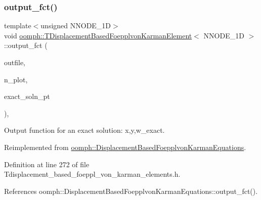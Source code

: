 \subsubsection{\texorpdfstring{output\+\_\+fct()}{output\_fct()}\hspace{0.1cm}{\footnotesize\ttfamily [1/2]}}
{\footnotesize\ttfamily template$<$unsigned N\+N\+O\+D\+E\+\_\+1D$>$ \\
void \hyperlink{classoomph_1_1TDisplacementBasedFoepplvonKarmanElement}{oomph\+::\+T\+Displacement\+Based\+Foepplvon\+Karman\+Element}$<$ N\+N\+O\+D\+E\+\_\+1D $>$\+::output\+\_\+fct (\begin{DoxyParamCaption}\item[{std\+::ostream \&}]{outfile,  }\item[{const unsigned \&}]{n\+\_\+plot,  }\item[{\hyperlink{classoomph_1_1FiniteElement_a690fd33af26cc3e84f39bba6d5a85202}{Finite\+Element\+::\+Steady\+Exact\+Solution\+Fct\+Pt}}]{exact\+\_\+soln\+\_\+pt }\end{DoxyParamCaption})\hspace{0.3cm}{\ttfamily [inline]}, {\ttfamily [virtual]}}



Output function for an exact solution\+: x,y,w\+\_\+exact. 



Reimplemented from \hyperlink{classoomph_1_1DisplacementBasedFoepplvonKarmanEquations_a43085c764ddc4c1b4676b3e89754f87a}{oomph\+::\+Displacement\+Based\+Foepplvon\+Karman\+Equations}.



Definition at line 272 of file Tdisplacement\+\_\+based\+\_\+foeppl\+\_\+von\+\_\+karman\+\_\+elements.\+h.



References oomph\+::\+Displacement\+Based\+Foepplvon\+Karman\+Equations\+::output\+\_\+fct().

\mbox{\label{classoomph_1_1TDisplacementBasedFoepplvonKarmanElement_ade2f7fd74d6db0275a9e8bb255d7e495}} 
